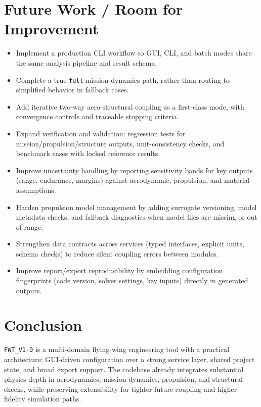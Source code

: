 ﻿\documentclass[11pt]{article}
\begin{document}
\section{Future Work / Room for Improvement}
\begin{itemize}
\item Implement a production CLI workflow so GUI, CLI, and batch modes share the same analysis pipeline and result schema.
\item Complete a true \texttt{full} mission-dynamics path, rather than routing to simplified behavior in fallback cases.
\item Add iterative two-way aero-structural coupling as a first-class mode, with convergence controls and traceable stopping criteria.
\item Expand verification and validation: regression tests for mission/propulsion/structure outputs, unit-consistency checks, and benchmark cases with locked reference results.
\item Improve uncertainty handling by reporting sensitivity bands for key outputs (range, endurance, margins) against aerodynamic, propulsion, and material assumptions.
\item Harden propulsion model management by adding surrogate versioning, model metadata checks, and fallback diagnostics when model files are missing or out of range.
\item Strengthen data contracts across services (typed interfaces, explicit units, schema checks) to reduce silent coupling errors between modules.
\item Improve report/export reproducibility by embedding configuration fingerprints (code version, solver settings, key inputs) directly in generated outputs.
\end{itemize}

\section{Conclusion}
\texttt{FWT\_V1-0} is a multi-domain flying-wing engineering tool with a practical architecture: GUI-driven configuration over a strong service layer, shared project state, and broad export support. The codebase already integrates substantial physics depth in aerodynamics, mission dynamics, propulsion, and structural checks, while preserving extensibility for tighter future coupling and higher-fidelity simulation paths.
\end{document}
